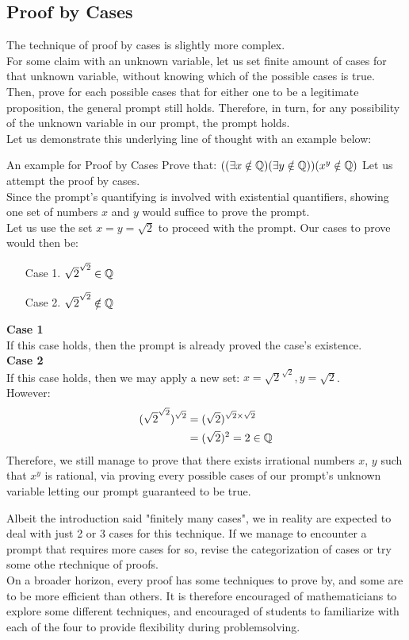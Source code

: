 \subsection{Proof by Cases}
The technique of proof by cases is slightly more complex. \\
For some claim with an unknown variable, let us set finite amount of cases for that unknown variable, without knowing which of the possible cases is true. Then, prove for each possible cases that for either one to be a legitimate proposition, the general prompt still holds. Therefore, in turn, for any possibility of the unknown variable in our prompt, the prompt holds. \\
Let us demonstrate this underlying line of thought with an example below:
\begin{ln-think}{An example for Proof by Cases}{}
    Prove that: $((\exists x \notin \mathbb{Q})(\exists y \notin \mathbb{Q}))(x^y \notin \mathbb{Q})$
    \tcblower
    Let us attempt the proof by cases. \\
    Since the prompt's quantifying is involved with existential quantifiers, showing one set of numbers $x$ and $y$ would suffice to prove the prompt. \\
    Let us use the set $x = y = \sqrt{2}$ to proceed with the prompt. Our cases to prove would then be:
    \begin{enumerate}
        \item[Case 1.] $\sqrt{2} ^ {\sqrt{2}} \in \mathbb{Q}$
        \item[Case 2.] $\sqrt{2} ^ {\sqrt{2}} \notin \mathbb{Q}$
    \end{enumerate}
    \textbf{Case 1} \\
    If this case holds, then the prompt is already proved the case's existence. \\
    \textbf{Case 2} \\
    If this case holds, then we may apply a new set: $x = \sqrt{2} ^ {\sqrt{2}}, y = \sqrt{2}$. \\
    However:
    \begin{align*}
        (\sqrt{2} ^ {\sqrt{2}}) ^ {\sqrt{2}}
        &= (\sqrt{2}) ^ {\sqrt{2} \times {\sqrt{2}}} \\
        &= (\sqrt{2}) ^ 2 = 2 \in \mathbb{Q}
    \end{align*}
    Therefore, we still manage to prove that there exists irrational numbers $x$, $y$ such that $x^y$ is rational, via proving every possible cases of our prompt's unknown variable letting our prompt guaranteed to be true.
\end{ln-think}
Albeit the introduction said "finitely many cases", we in reality are expected to deal with just 2 or 3 cases for this technique. If we manage to encounter a prompt that requires more cases for so, revise the categorization of cases or try some othe rtechnique of proofs. \\
On a broader horizon, every proof has some techniques to prove by, and some are to be more efficient than others. It is therefore encouraged of mathematicians to explore some different techniques, and encouraged of students to familiarize with each of the four to provide flexibility during problemsolving.

